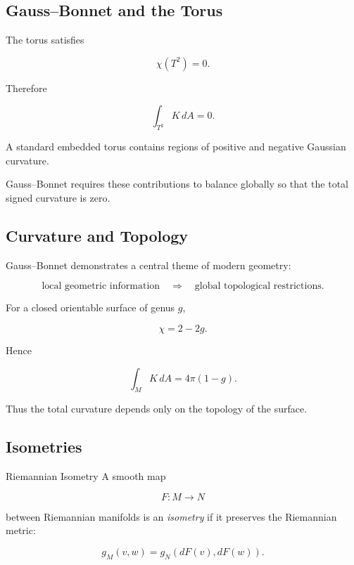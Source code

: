 \subsection{Gauss--Bonnet and the Torus}
\label{subsec:gauss-bonnet-torus}

The torus satisfies

\[
\chi(T^2)=0.
\]

Therefore

\[
\boxed{
\int_{T^2}K\,dA=0.
}
\]

A standard embedded torus contains regions of positive and negative Gaussian
curvature.

Gauss--Bonnet requires these contributions to balance globally so that the
total signed curvature is zero.

\subsection{Curvature and Topology}
\label{subsec:curvature-and-topology}

Gauss--Bonnet demonstrates a central theme of modern geometry:

\[
\boxed{
\text{local geometric information}
\quad\Longrightarrow\quad
\text{global topological restrictions}.
}
\]

For a closed orientable surface of genus \(g\),

\[
\boxed{
\chi=2-2g.
}
\]

Hence

\[
\boxed{
\int_MK\,dA
=
4\pi(1-g).
}
\]

Thus the total curvature depends only on the topology of the surface.

\subsection{Isometries}
\label{subsec:riemannian-isometries}

\begin{definitionbox}{Riemannian Isometry}
A smooth map

\[
F:M\to N
\]

between Riemannian manifolds is an \emph{isometry} if it preserves the
Riemannian metric:

\[
\boxed{
g_M(v,w)
=
g_N(dF(v),dF(w)).
}
\]
\end{definitionbox}

